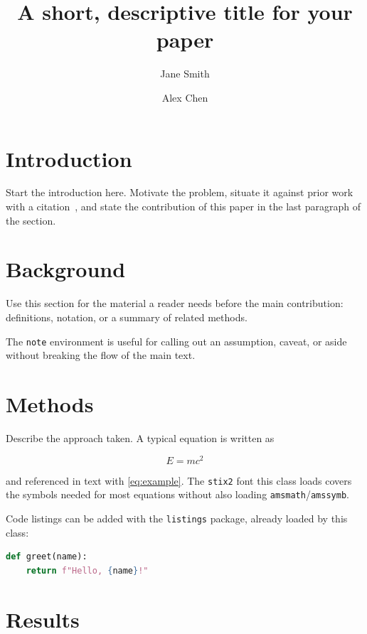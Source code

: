 \documentclass[9pt,a4paper,twocolumn,twoside]{rho-class/rho}
\title{A short, descriptive title for your paper}
\author[{\textasteriskcentered},a,1]{Jane Smith}
\author[b,2]{Alex Chen}
\affil[a]{Department of Physics, Fictional State University}
\affil[b]{Institute for Applied Research, Fictional State University}
\begin{document}
\maketitle

\section{Introduction}

Start the introduction here. Motivate the problem, situate it against prior
work with a citation~\cite{example2024}, and state the contribution of this
paper in the last paragraph of the section.

\section{Background}

Use this section for the material a reader needs before the main
contribution: definitions, notation, or a summary of related methods.

\begin{note}
    The \texttt{note} environment is useful for calling out an assumption,
    caveat, or aside without breaking the flow of the main text.
\end{note}

\section{Methods}

Describe the approach taken. A typical equation is written as

\begin{equation}
    E = mc^2
    \label{eq:example}
\end{equation}

and referenced in text with \cref{eq:example}. The \texttt{stix2} font this
class loads covers the symbols needed for most equations without also
loading \texttt{amsmath}/\texttt{amssymb}.

\begin{info}
    Code listings can be added with the \texttt{listings} package, already
    loaded by this class:
\begin{lstlisting}[language=Python, caption={A minimal example.}]
def greet(name):
    return f"Hello, {name}!"
\end{lstlisting}
\end{info}

\section{Results}
\end{document}
